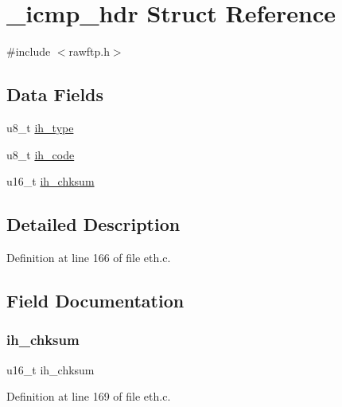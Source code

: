 \hypertarget{struct__icmp__hdr}{}\section{\+\_\+icmp\+\_\+hdr Struct Reference}
\label{struct__icmp__hdr}


{\ttfamily \#include $<$rawftp.\+h$>$}

\subsection*{Data Fields}
\begin{DoxyCompactItemize}
\item 
u8\+\_\+t \hyperlink{struct__icmp__hdr_aca1c40ab9e76627712fef1a463f8035a}{ih\+\_\+type}
\item 
u8\+\_\+t \hyperlink{struct__icmp__hdr_ab10b800c500017983489efe73f8074a6}{ih\+\_\+code}
\item 
u16\+\_\+t \hyperlink{struct__icmp__hdr_ad79a65ccbc2d162b23ea17345c51e75e}{ih\+\_\+chksum}
\end{DoxyCompactItemize}


\subsection{Detailed Description}


Definition at line 166 of file eth.\+c.



\subsection{Field Documentation}
\hypertarget{struct__icmp__hdr_ad79a65ccbc2d162b23ea17345c51e75e}{}\label{struct__icmp__hdr_ad79a65ccbc2d162b23ea17345c51e75e} 
\subsubsection{\texorpdfstring{ih\+\_\+chksum}{ih\_chksum}}
{\footnotesize\ttfamily u16\+\_\+t ih\+\_\+chksum}



Definition at line 169 of file eth.\+c.

\hypertarget{struct__icmp__hdr_ab10b800c500017983489efe73f8074a6}{}\label{struct__icmp__hdr_ab10b800c500017983489efe73f8074a6} 
